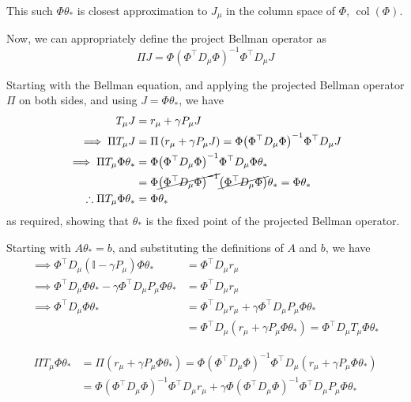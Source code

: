 This such \( \Phi \theta_\ast \) is closest approximation to \( J_\mu \) in the column space of \( \Phi \), \(\operatorname{col}(\Phi) \).

Now, we can appropriately define the project Bellman operator as
\[
    \Pi J = \Phi {(\Phi^\top D_\mu \Phi)}^{-1} \Phi^\top D_\mu J
\]

Starting with the Bellman equation, and applying the projected Bellman operator \( \Pi \) on both sides, and using \( J = \Phi \theta_\ast \), we have
\begin{align*}
    T_{\mu} J
     & =
    r_{\mu} + \gamma P_{\mu} J
    \\
    \implies
    \Pi T_{\mu} J
     & =
    \Pi \left(r_{\mu} + \gamma P_{\mu} J\right)
    =
    \Phi{\left(\Phi^{\top} D_{\mu} \Phi\right)}^{-1} \Phi^{\top} D_{\mu} J
    \\
    \implies
    \Pi T_{\mu} \Phi \theta_\ast
     & =
    \Phi{\left(\Phi^{\top} D_{\mu} \Phi\right)}^{-1} \Phi^{\top} D_{\mu} \Phi \theta_\ast
    \\ & =
    \Phi \cancel{{\left(\Phi^{\top} D_{\mu} \Phi\right)}^{-1}} \cancel{\left(\Phi^{\top} D_{\mu} \Phi\right)} \theta_\ast
    =
    \Phi \theta_\ast
    \\
    \therefore
    \Pi T_{\mu} \Phi \theta_\ast
     & =
    \Phi \theta_\ast
\end{align*}
as required, showing that \( \theta_\ast \) is the fixed point of the projected Bellman operator.

Starting with \( A \theta_\ast = b \), and substituting the definitions of \( A \) and \( b \), we have
\begin{align*}
    \implies
    \Phi^{\top} D_{\mu}\left(\mathbb{I}-\gamma P_{\mu}\right) \Phi \theta_\ast
     & =
    \Phi^{\top} D_{\mu} r_{\mu}
    \\
    \implies
    \Phi^{\top} D_{\mu} \Phi \theta_\ast - \gamma \Phi^{\top} D_{\mu} P_{\mu} \Phi \theta_\ast
     & =
    \Phi^{\top} D_{\mu} r_{\mu}
    \\
    \implies
    \Phi^{\top} D_{\mu} \Phi \theta_\ast
     & =
    \Phi^{\top} D_{\mu} r_{\mu} + \gamma \Phi^{\top} D_{\mu} P_{\mu} \Phi \theta_\ast
    \\ & =
    \Phi^{\top} D_{\mu} \left( r_{\mu} + \gamma P_{\mu} \Phi \theta_\ast \right)
    =
    \Phi^{\top} D_{\mu} T_{\mu} \Phi \theta_\ast
\end{align*}

\begin{align*}
    \Pi T_{\mu} \Phi \theta_\ast
     & =
    \Pi \left( r_{\mu} + \gamma P_{\mu} \Phi \theta_\ast \right)
    =
    \Phi{\left(\Phi^{\top} D_{\mu} \Phi\right)}^{-1} \Phi^{\top} D_{\mu} \left( r_{\mu} + \gamma P_{\mu} \Phi \theta_\ast \right)
    \\ & =
    \Phi{\left(\Phi^{\top} D_{\mu} \Phi\right)}^{-1} \Phi^{\top} D_{\mu} r_{\mu} + \gamma \Phi{\left(\Phi^{\top} D_{\mu} \Phi\right)}^{-1} \Phi^{\top} D_{\mu} P_{\mu} \Phi \theta_\ast
\end{align*}
